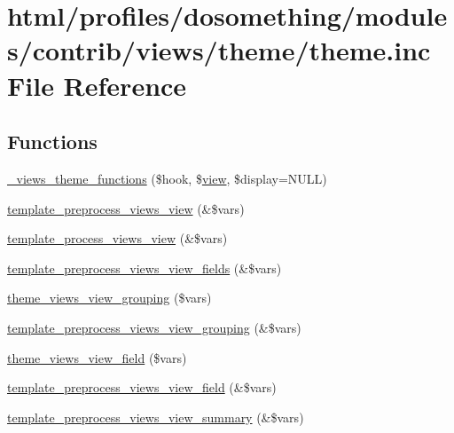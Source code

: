 \hypertarget{profiles_2dosomething_2modules_2contrib_2views_2theme_2theme_8inc}{
\section{html/profiles/dosomething/modules/contrib/views/theme/theme.inc File Reference}
\label{profiles_2dosomething_2modules_2contrib_2views_2theme_2theme_8inc}
}
\subsection*{Functions}
\begin{DoxyCompactItemize}
\item 
\hyperlink{profiles_2dosomething_2modules_2contrib_2views_2theme_2theme_8inc_acf9e7bcb84ebc378f901f483143d0ff0}{\_\-views\_\-theme\_\-functions} (\$hook, \$\hyperlink{classview}{view}, \$display=NULL)
\item 
\hyperlink{profiles_2dosomething_2modules_2contrib_2views_2theme_2theme_8inc_a9390b0a0ab9315839031fadfc73df433}{template\_\-preprocess\_\-views\_\-view} (\&\$vars)
\item 
\hyperlink{profiles_2dosomething_2modules_2contrib_2views_2theme_2theme_8inc_abc6cc4b40163cbc48a4fa70dc1a17b8e}{template\_\-process\_\-views\_\-view} (\&\$vars)
\item 
\hyperlink{profiles_2dosomething_2modules_2contrib_2views_2theme_2theme_8inc_a31ac9f4fe094685ae98063fe1ffbe341}{template\_\-preprocess\_\-views\_\-view\_\-fields} (\&\$vars)
\item 
\hyperlink{profiles_2dosomething_2modules_2contrib_2views_2theme_2theme_8inc_ad940f51fabee918aa8e62942c83c12ee}{theme\_\-views\_\-view\_\-grouping} (\$vars)
\item 
\hyperlink{profiles_2dosomething_2modules_2contrib_2views_2theme_2theme_8inc_a9ae18dd412333dcc63a233072c347a72}{template\_\-preprocess\_\-views\_\-view\_\-grouping} (\&\$vars)
\item 
\hyperlink{profiles_2dosomething_2modules_2contrib_2views_2theme_2theme_8inc_a339c44eecedc5e7219039007984a2cab}{theme\_\-views\_\-view\_\-field} (\$vars)
\item 
\hyperlink{profiles_2dosomething_2modules_2contrib_2views_2theme_2theme_8inc_a182621c56fc066ed50344ee82c900218}{template\_\-preprocess\_\-views\_\-view\_\-field} (\&\$vars)
\item 
\hyperlink{profiles_2dosomething_2modules_2contrib_2views_2theme_2theme_8inc_af9bd148476c77cdff1cca62726a24bd9}{template\_\-preprocess\_\-views\_\-view\_\-summary} (\&\$vars)

\end{DoxyCompactItemize}
